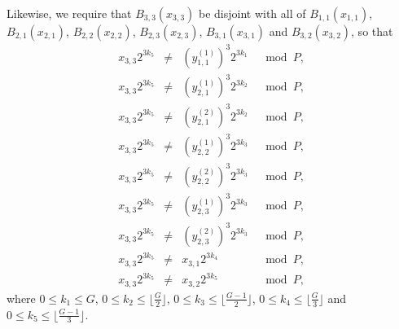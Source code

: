 \documentclass[12pt]{article} \pagestyle{plain} \topmargin
\begin{document}
Likewise, we require that $B_{3,3}(x_{3,3})$ be disjoint with all of
$B_{1,1}(x_{1,1})$, $B_{2,1}(x_{2,1})$, $B_{2,2}(x_{2,2})$,
$B_{2,3}(x_{2,3})$, $B_{3,1}(x_{3,1})$ and $B_{3,2}(x_{3,2})$, so
that
\begin{equation}\label{eqx33}\begin{array}{cccc}
x_{3,3}2^{3k_5} &\neq& (y_{1,1}^{(1)})^3 2^{3k_1} &\mod P, \\
x_{3,3}2^{3k_5} &\neq& (y_{2,1}^{(1)})^3 2^{3k_2} &\mod P, \\
x_{3,3}2^{3k_5} &\neq& (y_{2,1}^{(2)})^3 2^{3k_2} &\mod P, \\
x_{3,3}2^{3k_5} &\neq& (y_{2,2}^{(1)})^3 2^{3k_3} &\mod P, \\
x_{3,3}2^{3k_5} &\neq& (y_{2,2}^{(2)})^3 2^{3k_3} &\mod P, \\
x_{3,3}2^{3k_5} &\neq& (y_{2,3}^{(1)})^3 2^{3k_3} &\mod P, \\
x_{3,3}2^{3k_5} &\neq& (y_{2,3}^{(2)})^3 2^{3k_3} &\mod P, \\
x_{3,3}2^{3k_5} &\neq& x_{3,1} 2^{3k_4} &\mod P, \\
x_{3,3}2^{3k_5} &\neq& x_{3,2} 2^{3k_5} &\mod P,
\end{array}\end{equation}
where $0 \leq k_1 \leq G$, $0 \leq k_2 \leq \lfloor \frac{G}{2}
\rfloor$, $0 \leq k_3 \leq \lfloor\frac{G-1}{2} \rfloor$, $0 \leq
k_4 \leq \lfloor\frac{G}{3} \rfloor$ and $0 \leq k_5 \leq
\lfloor\frac{G-1}{3} \rfloor$.
\end{document}
